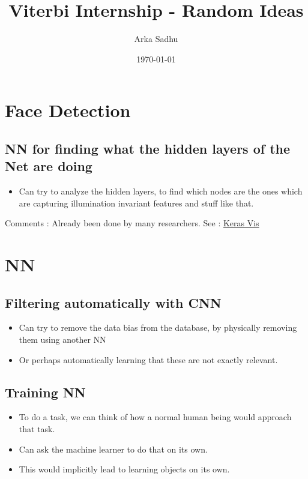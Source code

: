 \documentclass{article}
\title{Viterbi Internship - Random Ideas}
\author{
  Arka Sadhu}
\date{\today}
\begin{document}
\maketitle

\tableofcontents
\newpage
\section{Face Detection}
\subsection{NN for finding what the hidden layers of the Net are doing}
\begin{itemize}
\item Can try to analyze the hidden layers, to find which nodes are the ones which are capturing illumination invariant features and stuff like that.
\end{itemize}
Comments : Already been done by many researchers. See : \href{https://github.com/raghakot/keras-vis}{Keras Vis}
\section{NN}
\subsection{Filtering automatically with CNN}
\begin{itemize}
\item Can try to remove the data bias from the database, by physically removing them using another NN
\item Or perhaps automatically learning that these are not exactly relevant.
\end{itemize}

\subsection{Training NN}
\begin{itemize}
\item To do a task, we can think of how a normal human being would approach that task.
\item Can ask the machine learner to do that on its own.
\item This would implicitly lead to learning objects on its own.
\end{itemize}
\end{document}
